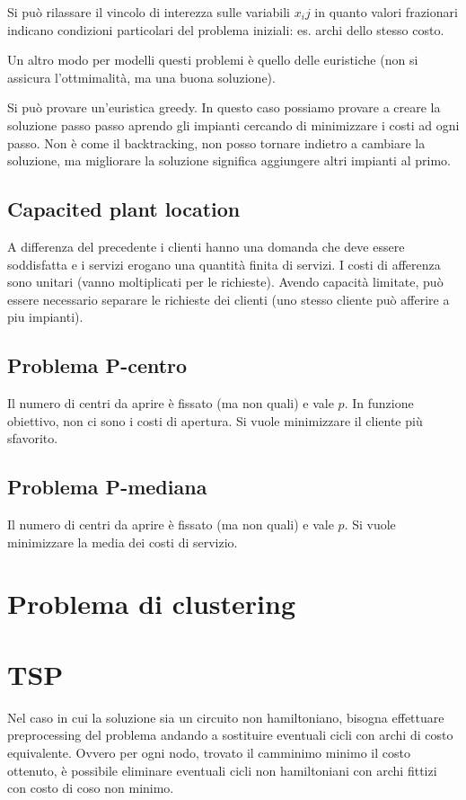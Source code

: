 \documentclass{article}
\begin{document}
Si può rilassare il vincolo di interezza sulle variabili $x_ij$ in quanto 
valori frazionari indicano condizioni particolari del problema iniziali: es. 
archi dello stesso costo.

Un altro modo per modelli questi problemi è quello delle euristiche (non si 
assicura l'ottmimalità, ma una buona soluzione).

Si può provare un'euristica greedy. In questo caso possiamo provare a creare la 
soluzione passo passo aprendo gli impianti cercando di minimizzare i costi ad 
ogni passo.
Non è come il backtracking, non posso tornare indietro a cambiare la soluzione,
ma migliorare la soluzione significa aggiungere altri impianti al primo.

\subsection{Capacited plant location}
A differenza del precedente i clienti hanno una domanda che deve essere soddisfatta 
e i servizi erogano una quantità finita di servizi. I costi di afferenza sono 
unitari (vanno moltiplicati per le richieste). Avendo capacità limitate, può
essere necessario separare le richieste dei clienti (uno stesso cliente può 
afferire a piu impianti).

\subsection{Problema P-centro}
Il numero di centri da aprire è fissato (ma non quali) e vale $p$. 
In funzione obiettivo, non ci sono i costi di apertura. Si vuole minimizzare 
il cliente più sfavorito.

\subsection{Problema P-mediana}
Il numero di centri da aprire è fissato (ma non quali) e vale $p$. Si vuole 
minimizzare la media dei costi di servizio.

\section{Problema di clustering}


\section{TSP}
Nel caso in cui la soluzione sia un circuito non hamiltoniano, bisogna effettuare 
preprocessing del problema andando a sostituire eventuali cicli con archi di 
costo equivalente. Ovvero per ogni nodo, trovato il camminimo minimo il costo 
ottenuto, è possibile eliminare eventuali cicli non hamiltoniani con archi 
fittizi con costo di coso non minimo.
\end{document}

